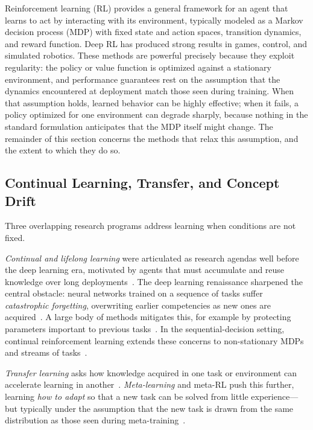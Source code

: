 Reinforcement learning (RL) provides a general framework for an agent that learns to act by interacting with its environment, typically modeled as a Markov decision process (MDP) with fixed state and action spaces, transition dynamics, and reward function. Deep RL has produced strong results in games, control, and simulated robotics. These methods are powerful precisely because they exploit regularity: the policy or value function is optimized against a stationary environment, and performance guarantees rest on the assumption that the dynamics encountered at deployment match those seen during training. When that assumption holds, learned behavior can be highly effective; when it fails, a policy optimized for one environment can degrade sharply, because nothing in the standard formulation anticipates that the MDP itself might change. The remainder of this section concerns the methods that relax this assumption, and the extent to which they do so.

\subsection{Continual Learning, Transfer, and Concept Drift}
\label{sec:continual_transfer_drift}

Three overlapping research programs address learning when conditions are not fixed.

\emph{Continual and lifelong learning} were articulated as research agendas well before the deep learning era, motivated by agents that must accumulate and reuse knowledge over long deployments~\citep{ring1994continual, thrun1995lifelong}. The deep learning renaissance sharpened the central obstacle: neural networks trained on a sequence of tasks suffer \emph{catastrophic forgetting}, overwriting earlier competencies as new ones are acquired~\citep{parisi2019continual, hadsell2020embracing}. A large body of methods mitigates this, for example by protecting parameters important to previous tasks~\citep{kirkpatrick2017overcoming}. In the sequential-decision setting, continual reinforcement learning extends these concerns to non-stationary MDPs and streams of tasks~\citep{khetarpal2022continual}.

\emph{Transfer learning} asks how knowledge acquired in one task or environment can accelerate learning in another~\citep{taylor2009transfer}. \emph{Meta-learning} and meta-RL push this further, learning \emph{how to adapt} so that a new task can be solved from little experience---but typically under the assumption that the new task is drawn from the same distribution as those seen during meta-training~\citep{finn2017maml, yu2020metaworld}.

